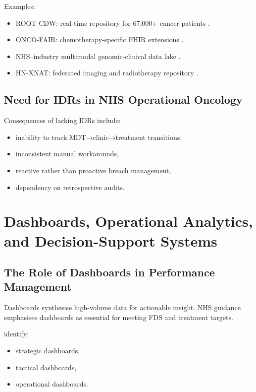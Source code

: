 Examples:

\begin{itemize}
    \item ROOT CDW: real‑time repository for 67,000+ cancer patients \citep{jung2021}.
    \item ONCO‑FAIR: chemotherapy‑specific FHIR extensions \citep{guilbert2024}.
    \item NHS–industry multimodal genomic-clinical data lake \citep{conway2025}.
    \item HN‑XNAT: federated imaging and radiotherapy repository \citep{butterworth2025}.
\end{itemize}

\subsection{Need for IDRs in NHS Operational Oncology}

Consequences of lacking IDRs include:

\begin{itemize}
    \item inability to track MDT→clinic→treatment transitions,
    \item inconsistent manual workarounds,
    \item reactive rather than proactive breach management,
    \item dependency on retrospective audits.
\end{itemize}

\section{Dashboards, Operational Analytics, and Decision-Support Systems}

\subsection{The Role of Dashboards in Performance Management}

Dashboards synthesise high-volume data for actionable insight. NHS guidance emphasises dashboards as essential for meeting FDS and treatment targets.

\cite{buttigieg2017} identify:

\begin{itemize}
    \item strategic dashboards,
    \item tactical dashboards,
    \item operational dashboards.
\end{itemize}

